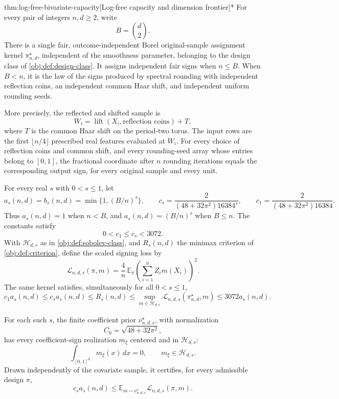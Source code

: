 \begin{theoremv}{thm:log-free-bivariate-capacity}[Log-free capacity and dimension frontier]*
For every pair of integers \(n,d\geq2\), write
\[
B=\binom d2.
\]
There is a single fair, outcome-independent Borel original-sample assignment kernel \(\pi^\star_{n,d}\), independent of the smoothness parameter, belonging to the design class of \cref{obj:def:design-class}. It assigns independent fair signs when \(n\leq B\). When \(B<n\), it is the law of the signs produced by spectral rounding with independent reflection coins, an independent common Haar shift, and independent uniform rounding seeds.

More precisely, the reflected and shifted sample is
\[
W_i=\operatorname{lift}(X_i,\text{reflection coins})+T,
\]
where \(T\) is the common Haar shift on the period-two torus. The input rows are the first \(\lfloor n/4\rfloor\) prescribed real features evaluated at \(W_i\). For every choice of reflection coins and common shift, and every rounding-seed array whose entries belong to \([0,1]\), the fractional coordinate after \(n\) rounding iterations equals the corresponding output sign, for every original sample and every unit.

For every real \(s\) with \(0<s\leq1\), let
\[
a_s(n,d)=b_s(n,d)=\min\{1,(B/n)^s\},
\qquad
c_s=\frac{2}{(48+32\pi^2)16384^s},
\qquad
c_1=\frac{2}{(48+32\pi^2)16384}.
\]
Thus \(a_s(n,d)=1\) when \(n<B\), and \(a_s(n,d)=(B/n)^s\) when \(B\leq n\). The constants satisfy
\[
0<c_1\leq c_s<3072.
\]
With \(\mathcal H_{d,s}\) as in \cref{obj:def:sobolev-class}, and \(R_s(n,d)\) the minimax criterion of \cref{obj:def:criterion}, define the scaled signing loss by
\[
\mathcal L_{n,d,s}(\pi,m)
=\frac4n\,\mathbb E_{\pi}
 \left(\sum_{i=1}^n Z_i m(X_i)\right)^2.
\]
The same kernel satisfies, simultaneously for all \(0<s\leq1\),
\[
c_1a_s(n,d)
\leq c_sa_s(n,d)
\leq R_s(n,d)
\leq \sup_{m\in\mathcal H_{d,s}}
       \mathcal L_{n,d,s}(\pi^\star_{n,d},m)
\leq3072a_s(n,d).
\]

For each such \(s\), the finite coefficient prior \(\nu^\star_{n,d,s}\), with normalization
\[
C_0=\sqrt{48+32\pi^2},
\]
has every coefficient-sign realization \(m_\xi\) centered and in \(\mathcal H_{d,s}\):
\[
\int_{[0,1]^d}m_\xi(x)\,dx=0,
\qquad
m_\xi\in\mathcal H_{d,s}.
\]
Drawn independently of the covariate sample, it certifies, for every admissible design \(\pi\),
\[
c_sa_s(n,d)
\leq
\mathbb E_{m\sim\nu^\star_{n,d,s}}
       \mathcal L_{n,d,s}(\pi,m).
\]


\end{theoremv}
